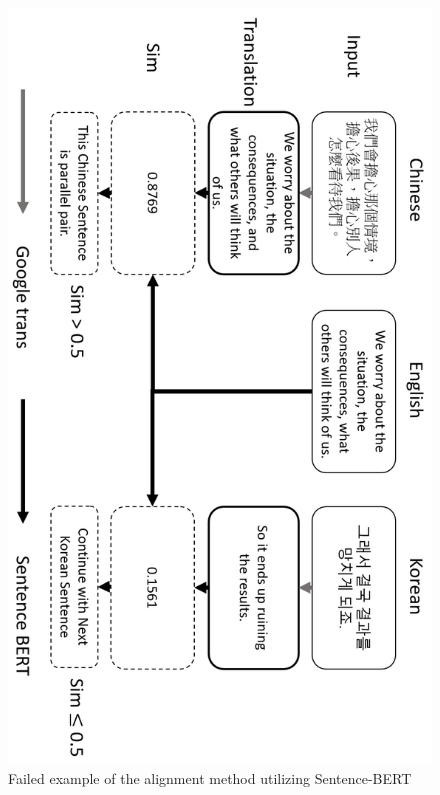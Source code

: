 \documentclass[PhD]{PHlab-thesis}
\begin{document}
\begin{figure}[h!]
  \centering
  \includegraphics[width=0.75\linewidth]{fig_3_5.jpg}
  \captionsetup{type=figure}
  \caption{Failed example of the alignment method utilizing Sentence-BERT}
  \label{fig:transcript}
\end{figure}


\end{document}
